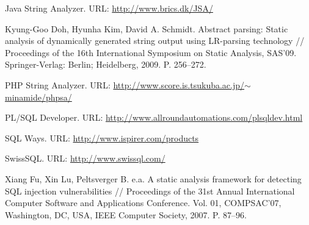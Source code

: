 \documentclass{llncs}
\begin{document}
\begin{thebibliography}{}
Java String Analyzer. URL: \href{http://www.brics.dk/JSA/}{http://www.brics.dk/JSA/}

Kyung-Goo Doh, Hyunha Kim, David A. Schmidt. Abstract parsing: Static analysis of dynamically generated string output using LR-parsing technology // Proceedings of the 16th International Symposium on Static Analysis, SAS’09. Springer-Verlag: Berlin; Heidelberg, 2009. P. 256–272.

PHP String Analyzer. URL: \href{http://www.score.is.tsukuba.ac.jp/~minamide/phpsa/}{http://www.score.is.tsukuba.ac.jp/$\sim$minamide/phpsa/}

PL/SQL Developer. URL: \href{http://www.allroundautomations.com/plsqldev.html}{http://www.allroundautomations.com/plsqldev.html}

SQL Ways. URL: \href{http://www.ispirer.com/products}{http://www.ispirer.com/products}

SwissSQL. URL: \href{http://www.swissql.com/}{http://www.swissql.com/}

Xiang Fu, Xin Lu, Peltsverger B. e.a. A static analysis framework for detecting SQL injection vulnerabilities // Proceedings of the 31st Annual International Computer Software and Applications Conference. Vol. 01, COMPSAC’07, Washington, DC, USA, IEEE Computer Society, 2007. P. 87–96.

\end{thebibliography}


%
\end{document}

